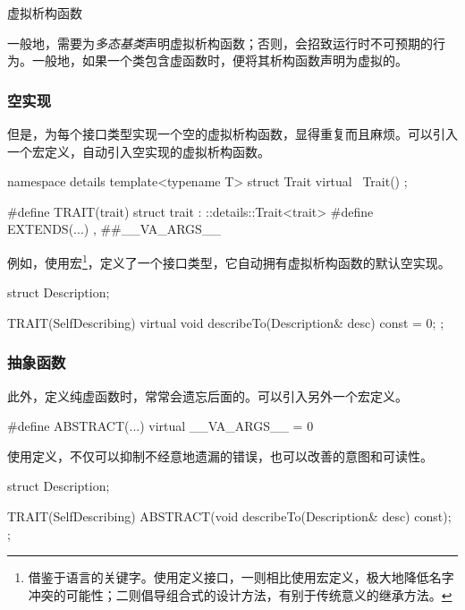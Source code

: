 \begin{content}
\begin{episode}{虚拟析构函数}
\begin{content}
一般地，需要为\emph{多态基类}声明虚拟析构函数；否则，会招致运行时不可预期的行为。一般地，如果一个类包含虚函数时，便将其析构函数声明为虚拟的。

\subsubsection{空实现}

但是，为每个接口类型实现一个空的虚拟析构函数，显得重复而且麻烦。可以引入一个宏定义，自动引入空实现的虚拟析构函数。

 \begin{c++}
namespace details {
  template<typename T>
  struct Trait {
    virtual ~Trait() {}
  };
}

#define TRAIT(trait)  struct trait : ::details::Trait<trait>
#define EXTENDS(...) , ##__VA_ARGS__
 \end{c++}

例如，使用宏\footnote{借鉴于语言的关键字。使用定义接口，一则相比使用宏定义，极大地降低名字冲突的可能性；二则倡导组合式的设计方法，有别于传统意义的继承方法。}，定义了一个接口类型，它自动拥有虚拟析构函数的默认空实现。

 \begin{c++}
struct Description;

TRAIT(SelfDescribing) {
  virtual void describeTo(Description& desc) const = 0;
};
 \end{c++}

\subsubsection{抽象函数}

此外，定义纯虚函数时，常常会遗忘后面的。可以引入另外一个宏定义。

 \begin{c++}
#define ABSTRACT(...) virtual __VA_ARGS__ = 0
 \end{c++}

使用定义，不仅可以抑制不经意地遗漏的错误，也可以改善的意图和可读性。

\begin{c++}
struct Description;

TRAIT(SelfDescribing) {
  ABSTRACT(void describeTo(Description& desc) const);
};
\end{c++}

\end{content}
\end{episode}


\end{content}
